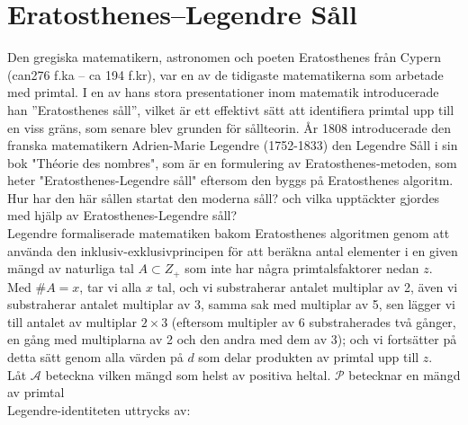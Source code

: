 \documentclass[12pt,a4paper]{article}
\newcommand{\A}{\mathcal{A}}
\renewcommand{\P}{\mathcal{P}}
\begin{document}
\section{Eratosthenes–Legendre Såll}
\hspace{0.3cm} Den gregiska matematikern, astronomen och poeten Eratosthenes från Cypern (can276 f.ka – ca 194 f.kr), var en av de tidigaste matematikerna som arbetade med primtal. I en av hans stora presentationer inom matematik introducerade han ”Eratosthenes såll”, vilket är ett effektivt sätt att identifiera primtal upp till en viss gräns, som senare blev grunden för sållteorin.
År 1808 introducerade den franska matematikern Adrien-Marie Legendre (1752-1833) den Legendre Såll i sin bok "Théorie des nombres", som är en formulering av Eratosthenes-metoden, som heter "Eratosthenes-Legendre såll" eftersom den byggs på Eratosthenes algoritm.\\


 Hur har den här sållen startat den moderna såll? och vilka upptäckter gjordes med hjälp av Eratosthenes-Legendre såll?\\



 Legendre formaliserade matematiken bakom Eratosthenes algoritmen genom att använda den inklusiv-exklusivprincipen för att beräkna antal elementer i en given mängd av naturliga tal  $ A\subset Z_{+} $ som inte har några primtalsfaktorer nedan $ z $. Med $  \#A=x $, tar vi alla $ x $ tal, och vi substraherar antalet multiplar av 2, även vi substraherar antalet multiplar av 3, samma sak med multiplar av 5, sen lägger vi till antalet av multiplar $ 2\times3 $ (eftersom multipler av 6 substraherades två gånger, en gång med multiplarna av 2 och den andra med dem av 3); och vi fortsätter på detta sätt genom alla värden på  $ d $ som delar produkten av primtal upp till  $ z $. \\
 
Låt $ \A $ beteckna vilken mängd som helst av positiva heltal. $ \P $ betecknar en mängd av primtal\\

Legendre-identiteten uttrycks av: 
\end{document}
